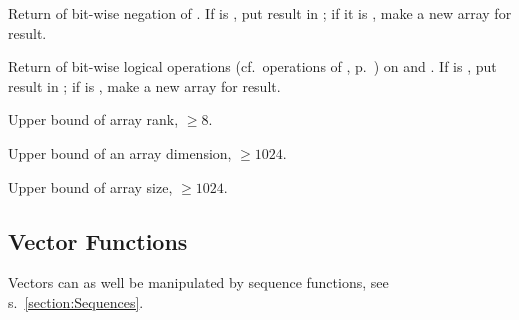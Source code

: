 \begin{LIST}{1cm}
  {
  Return  of bit-wise negation of . If  is \T, put
  result in ; if it is \NIL, make a new array for
  result. 
  }

  {
  Return  of bit-wise logical operations
  (cf.\ operations of , p.\ \pageref{section:Logic Functions}) on
   and  .  If  is \T, put result in
  ; if  is \NIL, make a new array for
  result. 
  }

  {
  Upper bound of array rank, $\geq 8$.
  }

  {
  Upper bound of an array dimension, $\geq 1024$.
  }

  {
  Upper bound of array size, $\geq 1024$.
  }

\end{LIST}


\subsection{Vector Functions} 

Vectors can as well be manipulated by sequence functions, see
s.~\ref{section:Sequences}. 

